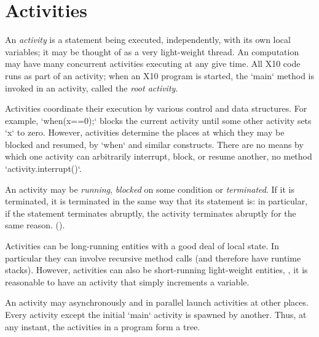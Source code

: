 \chapter{Activities}\label{XtenActivities}


An {\em activity} is a statement being executed, independently, with its own
local variables; it may be thought of as a very light-weight thread. An
\Xten{} computation may have many concurrent {activities} executing at any
give time.  All X10 code runs as part of an activity; when an X10 program is
started, the \xcd`main` method is invoked in an activity, called the {\em root
activity}.


Activities coordinate their execution by various control and data structures.
For example, 
\xcd`when(x==0);` blocks the current activity until some other activity
sets \xcd`x` to zero.  However, activities determine the places at which they
may be blocked and resumed, by \xcd`when` and similar constructs.  There are
no means by which one activity can arbitrarily interrupt, block, or resume
another, no method  \xcd`activity.interrupt()`.


An activity may be {\em running}, {\em blocked} on some condition or {\em
terminated}. If it is terminated, it is terminated in the same way that its
statement is: in particular, if the statement terminates abruptly, the
activity terminates abruptly for the same reason.
().

Activities can be long-running entities with a good deal of local state.  In
particular they can involve recursive method calls (and therefore have runtime
stacks).  However, activities can also be short-running light-weight entities,
\eg, it is reasonable to have an activity that simply increments a variable.

An activity may asynchronously and in parallel launch activities at
other places.  Every activity except the initial \xcd`main` activity is spawned
by another.  Thus, at any instant, the activities in a program form a tree.

